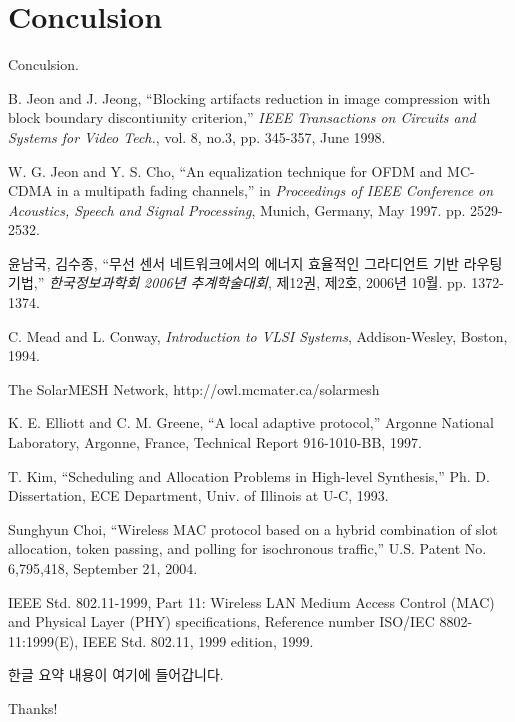 \documentclass[oneside,master]{snuthesis_utf8}
\begin{document}
\chapter{Conculsion}
Conculsion.

\begin{thebibliography}{00}

     B. Jeon and J. Jeong, ``Blocking artifacts
    reduction in image compression with block boundary discontiunity
    criterion,'' {\em IEEE Transactions on Circuits and Systems for
    Video Tech.}, vol. 8, no.3, pp. 345-357, June 1998.

     W. G. Jeon and Y. S. Cho, ``An equalization
    technique for OFDM and MC-CDMA in a multipath fading channels,''
    in {\em Proceedings of IEEE Conference on Acoustics, Speech and
    Signal Processing}, Munich, Germany, May 1997. pp. 2529-2532.

     윤남국, 김수종, ``무선 센서 네트워크에서의 에너지
    효율적인 그라디언트 기반 라우팅 기법,'' {\em 한국정보과학회
    2006년 추계학술대회}, 제12권, 제2호, 2006년 10월. pp.
    1372-1374.

     C. Mead and L. Conway, {\em Introduction to VLSI
    Systems}, Addison-Wesley, Boston, 1994.

     The SolarMESH Network,
    http://owl.mcmater.ca/solarmesh

     K. E. Elliott and C. M. Greene, ``A local adaptive
    protocol,'' Argonne National Laboratory, Argonne, France,
    Technical Report 916-1010-BB, 1997.

     T. Kim, ``Scheduling and Allocation Problems in
    High-level Synthesis,'' Ph. D. Dissertation, ECE Department,
    Univ. of Illinois at U-C, 1993.

     Sunghyun Choi, ``Wireless MAC protocol based on a
    hybrid combination of slot allocation, token passing, and
    polling for isochronous traffic,'' U.S. Patent No. 6,795,418,
    September 21, 2004.

     IEEE Std. 802.11-1999, Part 11: Wireless LAN
    Medium Access Control (MAC) and Physical Layer (PHY)
    specifications, Reference number ISO/IEC 8802-11:1999(E), IEEE
    Std. 802.11, 1999 edition, 1999.

\end{thebibliography}

\begin{abstractalt}
한글 요약 내용이 여기에 들어갑니다.
\end{abstractalt}

\acknowledgement
Thanks!
\end{document}
